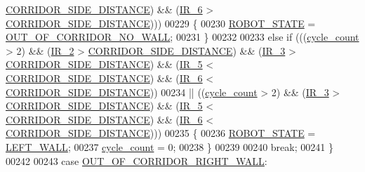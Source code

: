 \begin{DoxyCode}
      \hyperlink{state__machine_8c_a201d56046ddf552d57b4862e0ec07a10}{CORRIDOR\_SIDE\_DISTANCE}) && (\hyperlink{state__machine_8c_a8c51bcd8b555e8c78fea79b88d28b55e}{IR\_6} > 
      \hyperlink{state__machine_8c_a201d56046ddf552d57b4862e0ec07a10}{CORRIDOR\_SIDE\_DISTANCE})))
00229             \{
00230                 \hyperlink{state__machine_8h_a5e5321a4a9085b83c8161454bf7a145c}{ROBOT\_STATE} = \hyperlink{state__machine_8h_a94b1da2e055fff4d143aa6aa891f79a9a24fb9d9ff0b7ac346a2527509a251125}{OUT\_OF\_CORRIDOR\_NO\_WALL};
00231             \}
00232             
00233             \textcolor{keywordflow}{else} \textcolor{keywordflow}{if} (((\hyperlink{state__machine_8c_a937f74a65988b9e22241ab3765b82c50}{cycle\_count} > 2) && (\hyperlink{state__machine_8c_a07cfb2e201909d017a88a2a86c32cd4b}{IR\_2} > 
      \hyperlink{state__machine_8c_a201d56046ddf552d57b4862e0ec07a10}{CORRIDOR\_SIDE\_DISTANCE}) && (\hyperlink{state__machine_8c_a7831b71dc250258ecefe0e23f9920688}{IR\_3} > 
      \hyperlink{state__machine_8c_a201d56046ddf552d57b4862e0ec07a10}{CORRIDOR\_SIDE\_DISTANCE}) && (\hyperlink{state__machine_8c_ad00ba6cc1cf461bda7059f5aafc06142}{IR\_5} < 
      \hyperlink{state__machine_8c_a201d56046ddf552d57b4862e0ec07a10}{CORRIDOR\_SIDE\_DISTANCE}) && (\hyperlink{state__machine_8c_a8c51bcd8b555e8c78fea79b88d28b55e}{IR\_6} < 
      \hyperlink{state__machine_8c_a201d56046ddf552d57b4862e0ec07a10}{CORRIDOR\_SIDE\_DISTANCE}))
00234                   || ((\hyperlink{state__machine_8c_a937f74a65988b9e22241ab3765b82c50}{cycle\_count} > 2) &&  (\hyperlink{state__machine_8c_a7831b71dc250258ecefe0e23f9920688}{IR\_3} > 
      \hyperlink{state__machine_8c_a201d56046ddf552d57b4862e0ec07a10}{CORRIDOR\_SIDE\_DISTANCE}) && (\hyperlink{state__machine_8c_ad00ba6cc1cf461bda7059f5aafc06142}{IR\_5} < 
      \hyperlink{state__machine_8c_a201d56046ddf552d57b4862e0ec07a10}{CORRIDOR\_SIDE\_DISTANCE}) && (\hyperlink{state__machine_8c_a8c51bcd8b555e8c78fea79b88d28b55e}{IR\_6} < 
      \hyperlink{state__machine_8c_a201d56046ddf552d57b4862e0ec07a10}{CORRIDOR\_SIDE\_DISTANCE})))
00235             \{
00236                 \hyperlink{state__machine_8h_a5e5321a4a9085b83c8161454bf7a145c}{ROBOT\_STATE} = \hyperlink{state__machine_8h_a94b1da2e055fff4d143aa6aa891f79a9a432a66e9cf59d20911b0409c4366bbfb}{LEFT\_WALL};
00237                 \hyperlink{state__machine_8c_a937f74a65988b9e22241ab3765b82c50}{cycle\_count} = 0;
00238             \}
00239             
00240             \textcolor{keywordflow}{break};
00241         \}
00242         
00243         \textcolor{keywordflow}{case} \hyperlink{state__machine_8h_a94b1da2e055fff4d143aa6aa891f79a9abb071018d1b1e80867c6ba4c5ddc1615}{OUT\_OF\_CORRIDOR\_RIGHT\_WALL}:

\end{DoxyCode}
